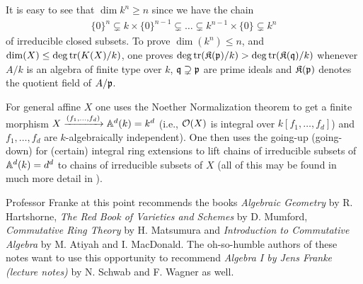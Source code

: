 \documentclass[a4paper,parskip=full,numbers=enddot]{scrreprt}
\begin{document}
\begin{rem}
	It is easy to see that $\dim k^n \geq n$ since we have the chain
	\begin{align*}
		\{0\}^n \subsetneq k\times\{0\}^{n-1} \subsetneq\ldots\subsetneq k^{n-1}\times\{0\} \subsetneq k^n
	\end{align*} of irreducible closed subsets. To prove $\dim(k^n) \leq n$, and $\dim(X) \leq\deg\operatorname{tr}(K(X)/k)$, one proves $\deg\operatorname{tr}(\mathfrak{K}(\mathfrak{p})/k) > \deg\operatorname{tr}(\mathfrak{K}(\mathfrak{q})/k)$ whenever $A/k$ is an algebra of finite type over $k$, $\mathfrak{q}\supsetneq \mathfrak{p}$ are prime ideals and $\mathfrak{K}(\mathfrak{p})$ denotes the quotient field of $A/\mathfrak{p}$. 
    
    For general affine $X$ one uses the Noether Normalization theorem to get a finite morphism $X\xrightarrow{(f_1,\ldots,f_d)} \mathbb{A}^d(k)=k^d$ (i.e., $\mathcal{O}(X)$ is integral over $k[f_1,\ldots,f_d]$) and $f_1,\ldots,f_d$ are $k$-algebraically independent). One then uses the going-up (going-down) for (certain) integral ring extensions to lift chains of irreducible subsets of $\mathbb{A}^d(k)=d^d$ to chains of irreducible subsets of $X$ (all of this may be found in much more detail in \cite[Section~2.4-2.6]{alg1}).
    
    Professor Franke at this point recommends the books \emph{Algebraic Geometry} by R. Hartshorne, \emph{The Red Book of Varieties and Schemes} by D. Mumford, \emph{Commutative Ring Theory} by H. Matsumura and \emph{Introduction to Commutative Algebra} by M. Atiyah and I. MacDonald. The oh-so-humble authors of these notes want to use this opportunity to recommend \emph{Algebra I by Jens Franke (lecture notes)} by N. Schwab and F. Wagner \cite{alg1} as well.
\end{rem}
\end{document}
